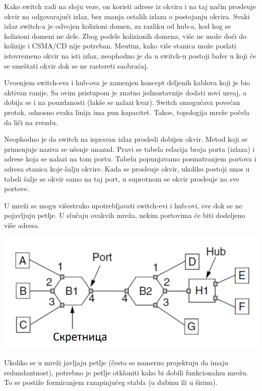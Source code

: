 \documentclass{article} %
\begin{document}
Kako switch radi na sloju veze, on koristi adrese iz okvira i na taj na\v{c}in prosle\dj{}uje okvir na odgovaraju\'{c}i izlaz, bez znanja ostalih izlaza o postojanju okvira. Svaki izlaz switch-a je odvojen kolizioni domen, za razliku od hub-a, kod kog se kolizioni domeni ne dele. Zbog podele kolizionih domena, vi\v{s}e ne mo\v{z}e do\'{c}i do kolizije i CSMA/CD nije potreban. Me\dj{}utim, kako vi\v{s}e stanica mo\v{z}e poslati istovremeno okvir na isti izlaz, neophodno je da u switch-u postoji bafer u koji \'{c}e se sme\v{s}tati okvir dok se ne rastereti saobra\'{c}aj.

Uvo\dj{}enjem switch-eva i hub-ova je zamenjen koncept deljenih kablova koji je bio aktivan ranije. Sa ovim pristupom je znatno jednostavnije dodati novi ure\dj{}aj, a dobija se i na pouzdanosti (lak\v{s}e se nalazi kvar). Switch omogu\'{c}ava pove\'{c}an protok, odnosno svaka linija ima pun kapacitet. Tako\dj{}e, topologija mre\v{z}e po\v{c}ela da li\v{c}i na zvezdu.

Neophodno je da switch na ispravan izlaz prosledi dobijen okvir. Metod koji se primenjuje naziva se u\v{s}enje unazad. Pravi se tabela relacija broja porta (izlaza) i adrese koja se nalazi na tom portu. Tabelu popunjavamo posmatranjem portova i adresa stanica koje \v{s}alju okvire. Kada se prosle\dj{}uje okvir, ukoliko postoji unos u tabeli \v{s}alje se okvir samo na taj port, u suprotnom se okvir prosle\dj{}uje na sve portove.

U mre\v{z}i se mogu vi\v{s}estruko upotrebljavati switch-evi i hub-ovi, sve dok se ne pojavljuju petlje. U slu\v{c}aju ovakvih mre\v{z}a, nekim portovima \'{c}e biti dodeljeno vi\v{s}e adresa.

\begin{center}
\includegraphics[scale=0.3]{visestruki-hub-switch}
\end{center}

Ukoliko se u mre\v{z}i javljaju petlje (\v{c}esto se namerno projektuju da imaju redundantnost), potrebno je petlje otkloniti kako bi dobili funkcionalnu mre\v{z}u. To se posti\v{z}e formiranjem razapinju\'{c}eg stabla (u dubinu ili u \v{s}irinu).
\end{document}
